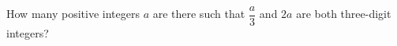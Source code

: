 How many positive integers $a$ are there such that $\dfrac a3$ and $2a$ are both three-digit integers?
